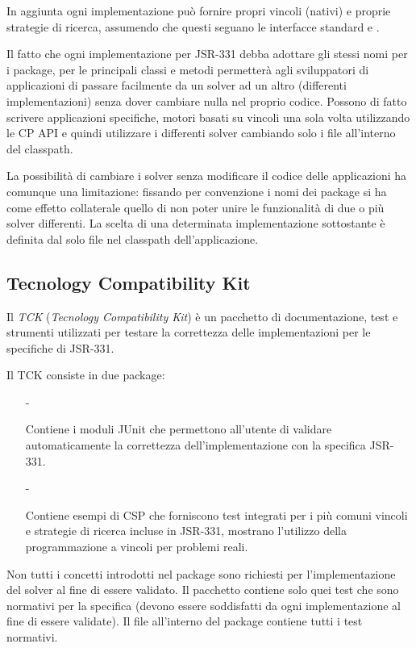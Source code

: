 In aggiunta ogni implementazione può fornire propri vincoli (nativi) e
proprie strategie di ricerca, assumendo che questi seguano le interfacce 
standard  e 
.

Il fatto che ogni implementazione per JSR-331 debba adottare gli stessi
nomi per i package, per le principali classi e metodi permetterà agli 
sviluppatori di applicazioni di passare facilmente da un solver ad
un altro (differenti implementazioni) senza  dover cambiare nulla nel proprio
codice. Possono di fatto scrivere applicazioni specifiche, motori basati su
vincoli una sola volta utilizzando le CP API e quindi utilizzare i differenti 
solver cambiando solo i file  all'interno del classpath.

\begin{nota}
La possibilità di cambiare i solver senza modificare il codice delle 
applicazioni ha comunque una limitazione: fissando  per convenzione i nomi
dei package si ha come effetto collaterale quello di non poter unire
le funzionalità di due o più solver differenti. La scelta di una determinata 
implementazione sottostante è definita dal solo file  nel
classpath dell'applicazione.
\end{nota}

\subsection{Tecnology Compatibility Kit}
Il \emph{TCK} (\emph{Tecnology Compatibility Kit}) è un pacchetto di 
documentazione, test e  strumenti utilizzati per testare la correttezza delle 
implementazioni per le specifiche di JSR-331.

Il TCK consiste in due package:
\begin{itemize}
\item[-]

Contiene i moduli 
JUnit che permettono all'utente di validare automaticamente la correttezza
dell'implementazione con la specifica JSR-331.

\item[-]

Contiene esempi di CSP che 
forniscono test integrati per i più comuni vincoli e
strategie di ricerca incluse in JSR-331, mostrano l'utilizzo della
programmazione a vincoli per problemi reali.
\end{itemize}

Non tutti i concetti introdotti nel package  sono
richiesti per l'implementazione del solver al fine di essere validato.
Il pacchetto  contiene solo quei test che
sono normativi per la specifica (devono essere soddisfatti da ogni
implementazione al fine di essere validate). Il file 
 all'interno del package contiene tutti i test normativi.

